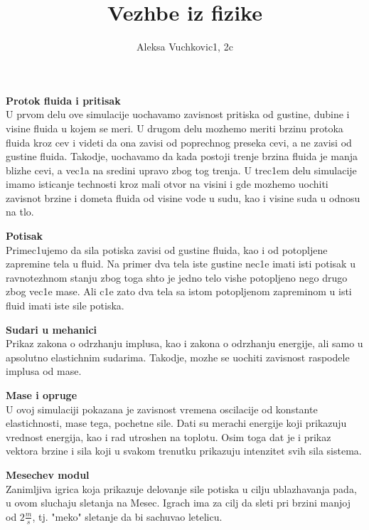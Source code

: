 \documentclass[11pt]{article}
\title{\bf{Vezhbe iz fizike}}
\author{\Large Aleksa Vuchkovic1, 2c}
\date{}
\begin{document}
\maketitle
\large
\begin{vez} \textbf{Protok fluida i pritisak}\\
U prvom delu ove simulacije uochavamo zavisnost pritiska od gustine, dubine i visine fluida u kojem se meri. U drugom delu mozhemo meriti brzinu protoka fluida kroz cev i videti da ona zavisi od poprechnog preseka cevi, a ne zavisi od gustine fluida. Takodje, uochavamo da kada postoji trenje brzina fluida je manja blizhe cevi, a vec1a na sredini upravo zbog tog trenja. U trec1em delu simulacije imamo isticanje technosti kroz mali otvor na visini i gde mozhemo uochiti zavisnot brzine i dometa fluida od visine vode u sudu, kao i visine suda u odnosu na tlo.
\end{vez}
\begin{vez} \textbf{Potisak}\\
Primec1ujemo da sila potiska zavisi od gustine fluida, kao i od potopljene zapremine tela u fluid. Na primer dva tela iste gustine nec1e imati isti potisak u ravnotezhnom stanju zbog toga shto je jedno telo vishe potopljeno nego drugo zbog vec1e mase. Ali c1e zato dva tela sa istom potopljenom zapreminom u isti fluid imati iste sile potiska.
\end{vez}
\begin{vez} \textbf{Sudari u mehanici}\\
Prikaz zakona o odrzhanju implusa, kao i zakona o odrzhanju energije, ali samo u apsolutno elastichnim sudarima. Takodje, mozhe se uochiti zavisnost raspodele implusa od mase.
\end{vez}
\begin{vez} \textbf{Mase i opruge}\\
U ovoj simulaciji pokazana je zavisnost vremena oscilacije od konstante elastichnosti, mase tega, pochetne sile. Dati su merachi energije koji prikazuju vrednost energija, kao i rad utroshen na toplotu. Osim toga dat je i prikaz vektora brzine i sila koji u svakom trenutku prikazuju intenzitet svih sila sistema.
\end{vez}
\begin{vez} \textbf{Mesechev modul}\\
Zanimljiva igrica koja prikazuje delovanje sile potiska u cilju ublazhavanja pada, u ovom sluchaju sletanja na Mesec. Igrach ima za cilj da sleti pri brzini manjoj od $2\frac{m}{s}$, tj. "meko" sletanje da bi sachuvao letelicu.
\end{vez}
\end{document}
